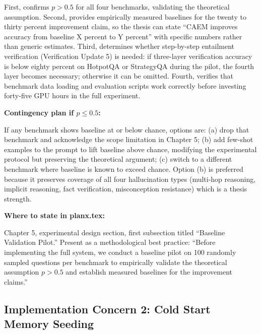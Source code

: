 \documentclass[11pt,a4paper]{article}
\begin{document}
{First, confirms $p > 0.5$ for all four benchmarks, validating the theoretical assumption. Second, provides empirically measured baselines for the twenty to thirty percent improvement claim, so the thesis can state ``CAEM improves accuracy from baseline X percent to Y percent'' with specific numbers rather than generic estimates. Third, determines whether step-by-step entailment verification (Verification Update 5) is needed: if three-layer verification accuracy is below eighty percent on HotpotQA or StrategyQA during the pilot, the fourth layer becomes necessary; otherwise it can be omitted. Fourth, verifies that benchmark data loading and evaluation scripts work correctly before investing forty-five GPU hours in the full experiment.

\textbf{Contingency plan if $p \leq 0.5$:}

If any benchmark shows baseline at or below chance, options are: (a) drop that benchmark and acknowledge the scope limitation in Chapter 5; (b) add few-shot examples to the prompt to lift baseline above chance, modifying the experimental protocol but preserving the theoretical argument; (c) switch to a different benchmark where baseline is known to exceed chance. Option (b) is preferred because it preserves coverage of all four hallucination types (multi-hop reasoning, implicit reasoning, fact verification, misconception resistance) which is a thesis strength.

\textbf{Where to state in planx.tex:}

Chapter 5, experimental design section, first subsection titled ``Baseline Validation Pilot.'' Present as a methodological best practice: ``Before implementing the full system, we conduct a baseline pilot on 100 randomly sampled questions per benchmark to empirically validate the theoretical assumption $p > 0.5$ and establish measured baselines for the improvement claims.''
}

\subsection{Implementation Concern 2: Cold Start Memory Seeding}
\end{document}
